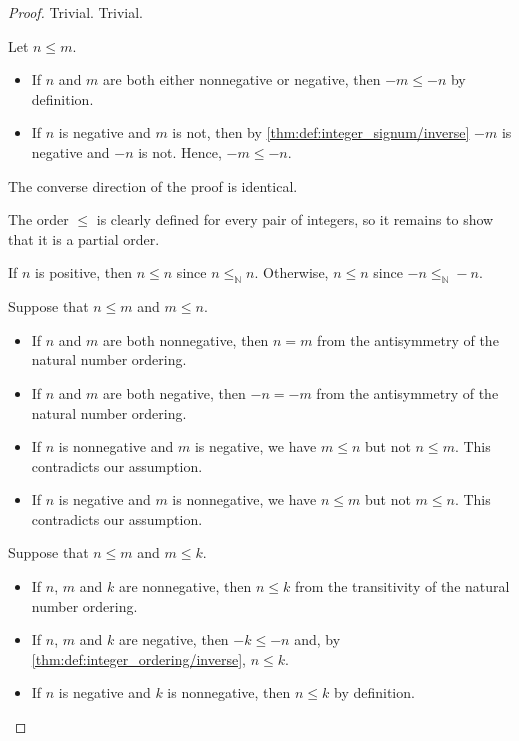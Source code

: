 \begin{proof}
   Trivial.
   Trivial.

   Let \( n \leq m \).
  \begin{itemize}
    \item If \( n \) and \( m \) are both either nonnegative or negative, then \( -m \leq -n \) by definition.
    \item If \( n \) is negative and \( m \) is not, then by \cref{thm:def:integer_signum/inverse} \( -m \) is negative and \( -n \) is not. Hence, \( -m \leq -n \).
  \end{itemize}

  The converse direction of the proof is identical.

   The order \( \leq \) is clearly defined for every pair of integers, so it remains to show that it is a partial order.

   If \( n \) is positive, then \( n \leq n \) since \( n \leq_\BbbN n \). Otherwise, \( n \leq n \) since \( -n \leq_\BbbN -n \).

   Suppose that \( n \leq m \) and \( m \leq n \).
  \begin{itemize}
    \item If \( n \) and \( m \) are both nonnegative, then \( n = m \) from the antisymmetry of the natural number ordering.
    \item If \( n \) and \( m \) are both negative, then \( -n = -m \) from the antisymmetry of the natural number ordering.
    \item If \( n \) is nonnegative and \( m \) is negative, we have \( m \leq n \) but not \( n \leq m \). This contradicts our assumption.
    \item If \( n \) is negative and \( m \) is nonnegative, we have \( n \leq m \) but not \( m \leq n \). This contradicts our assumption.
  \end{itemize}

   Suppose that \( n \leq m \) and \( m \leq k \).
  \begin{itemize}
    \item If \( n \), \( m \) and \( k \) are nonnegative, then \( n \leq k \) from the transitivity of the natural number ordering.
    \item If \( n \), \( m \) and \( k \) are negative, then \( -k \leq -n \) and, by \cref{thm:def:integer_ordering/inverse}, \( n \leq k \).
    \item If \( n \) is negative and \( k \) is nonnegative, then \( n \leq k \) by definition.
  \end{itemize}


\end{proof}
